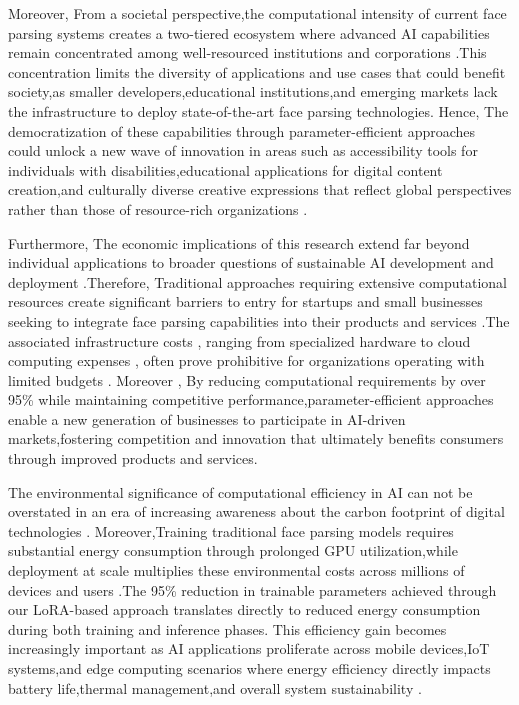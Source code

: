 \documentclass[12pt,a4paper]{report}
\begin{document}
Moreover, From a societal perspective,the computational intensity of current face parsing systems creates a two-tiered ecosystem where advanced AI capabilities remain concentrated among well-resourced institutions and corporations \cite{raji2020saving}.This concentration limits the diversity of applications and use cases that could benefit society,as smaller developers,educational institutions,and emerging markets lack the infrastructure to deploy state-of-the-art face parsing technologies. Hence, The democratization of these capabilities through parameter-efficient approaches could unlock a new wave of innovation in areas such as accessibility tools for individuals with disabilities,educational applications for digital content creation,and culturally diverse creative expressions that reflect global perspectives rather than those of resource-rich organizations \cite{barocas2019fairness}.

Furthermore, The economic implications of this research extend far beyond individual applications to broader questions of sustainable AI development and deployment \cite{thompson2021computational}.Therefore, Traditional approaches requiring extensive computational resources create significant barriers to entry for startups and small businesses seeking to integrate face parsing capabilities into their products and services \cite{brynjolfsson2017artificial}.The associated infrastructure costs , ranging from specialized hardware to cloud computing expenses , often prove prohibitive for organizations operating with limited budgets . Moreover , By reducing computational requirements by over 95\% while maintaining competitive performance,parameter-efficient approaches enable a new generation of businesses to participate in AI-driven markets,fostering competition and innovation that ultimately benefits consumers through improved products and services.

The environmental significance of computational efficiency in AI can not be overstated in an era of increasing awareness about the carbon footprint of digital technologies \cite{strubell2019energy,schwartz2020green}. Moreover,Training traditional face parsing models requires substantial energy consumption through prolonged GPU utilization,while deployment at scale multiplies these environmental costs across millions of devices and users \cite{lacoste2019quantifying}.The 95\% reduction in trainable parameters achieved through our LoRA-based approach translates directly to reduced energy consumption during both training and inference phases. This efficiency gain becomes increasingly important as AI applications proliferate across mobile devices,IoT systems,and edge computing scenarios where energy efficiency directly impacts battery life,thermal management,and overall system sustainability \cite{li2020edge}.
\end{document}
